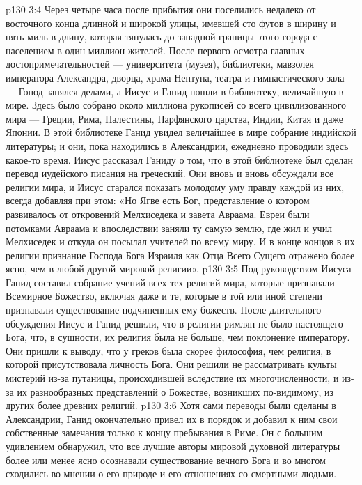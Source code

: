 \vs p130 3:4 \pc Через четыре часа после прибытия они поселились недалеко от восточного конца длинной и широкой улицы, имевшей сто футов в ширину и пять миль в длину, которая тянулась до западной границы этого города с населением в один миллион жителей. После первого осмотра главных достопримечательностей --- университета (музея), библиотеки, мавзолея императора Александра, дворца, храма Нептуна, театра и гимнастического зала --- Гонод занялся делами, а Иисус и Ганид пошли в библиотеку, величайшую в мире. Здесь было собрано около миллиона рукописей со всего цивилизованного мира --- Греции, Рима, Палестины, Парфянского царства, Индии, Китая и даже Японии. В этой библиотеке Ганид увидел величайшее в мире собрание индийской литературы; и они, пока находились в Александрии, ежедневно проводили здесь какое\hyp{}то время. Иисус рассказал Ганиду о том, что в этой библиотеке был сделан перевод иудейского писания на греческий. Они вновь и вновь обсуждали все религии мира, и Иисус старался показать молодому уму правду каждой из них, всегда добавляя при этом: «Но Ягве есть Бог, представление о котором развивалось от откровений Мелхиседека и завета Авраама. Евреи были потомками Авраама и впоследствии заняли ту самую землю, где жил и учил Мелхиседек и откуда он посылал учителей по всему миру. И в конце концов в их религии признание Господа Бога Израиля как Отца Всего Сущего отражено более ясно, чем в любой другой мировой религии».
\vs p130 3:5 \pc Под руководством Иисуса Ганид составил собрание учений всех тех религий мира, которые признавали Всемирное Божество, включая даже и те, которые в той или иной степени признавали существование подчиненных ему божеств. После длительного обсуждения Иисус и Ганид решили, что в религии римлян не было настоящего Бога, что, в сущности, их религия была не больше, чем поклонение императору. Они пришли к выводу, что у греков была скорее философия, чем религия, в которой присутствовала личность Бога. Они решили не рассматривать культы мистерий из\hyp{}за путаницы, происходившей вследствие их многочисленности, и из\hyp{}за их разнообразных представлений о Божестве, возникших по\hyp{}видимому, из других более древних религий.
\vs p130 3:6 Хотя сами переводы были сделаны в Александрии, Ганид окончательно привел их в порядок и добавил к ним свои собственные замечания только к концу пребывания в Риме. Он с большим удивлением обнаружил, что все лучшие авторы мировой духовной литературы более или менее ясно осознавали существование вечного Бога и во многом сходились во мнении о его природе и его отношениях со смертными людьми.
